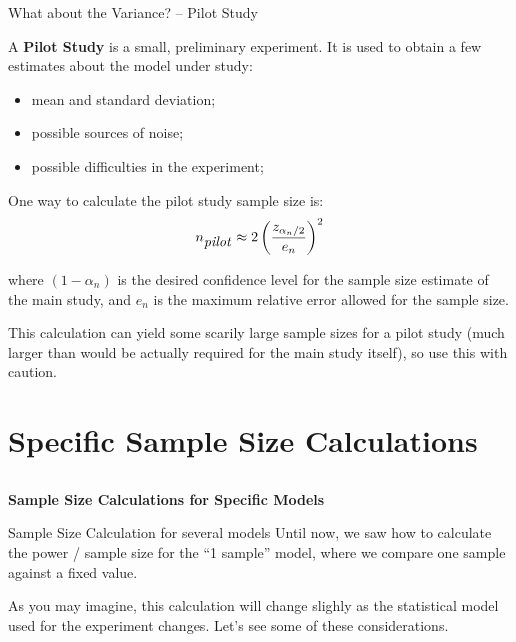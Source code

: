 \begin{frame}{What about the Variance? -- Pilot Study}{}

  A {\bf Pilot Study} is a small, preliminary experiment. It is used
  to obtain a few estimates about the model under study:
  \begin{itemize}
  \item mean and standard deviation;
  \item possible sources of noise;
  \item possible difficulties in the experiment;
  \end{itemize}

  One way to calculate the pilot study sample size is:
  \begin{equation*}
    n_{\mbox{\textit{pilot}}}\approx 2\left(\frac{z_{\alpha_n/2}}{e_{n}}\right)^2
  \end{equation*}

  \noindent where $(1-\alpha_{n})$ is the desired confidence level for
  the sample size estimate of the main study, and $e_n$ is the maximum
  relative error allowed for the sample size.\bigskip

  This calculation can yield some scarily large sample sizes for a
  pilot study (much larger than would be actually required for the
  main study itself), so use this with caution.
\end{frame}


\section{Specific Sample Size Calculations}
\subsection{}
\begin{frame}{}
  \begin{center}
    {\bf Sample Size Calculations for Specific Models}
  \end{center}
\end{frame}


\begin{frame}{Sample Size Calculation for several models}
  Until now, we saw how to calculate the power / sample size for the
  ``1 sample'' model, where we compare one sample against a fixed
  value.\bigskip

  As you may imagine, this calculation will change slighly as the
  statistical model used for the experiment changes. Let's see some of
  these considerations.  
\end{frame}

